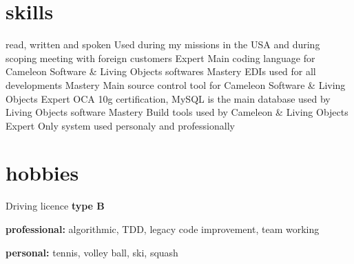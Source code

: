 \documentclass{friggeri-cv} 	%
\begin{document}
\section{skills}

\begin{capabilitize}
		{read, written and spoken}
		{Used during my missions in the USA and during scoping meeting with foreign customers}
		{Expert}
		{Main coding language for Cameleon Software \& Living Objects softwares}
		{Mastery}
		{EDIs used for all developments}
		{Mastery}
		{Main source control tool for Cameleon Software \& Living Objects}
		{Expert}
		{OCA 10g certification, MySQL is the main database used by Living Objects software}
		{Mastery}
		{Build tools used by Cameleon \& Living Objects}
		{Expert}
		{Only system used personaly and professionally}
\end{capabilitize}


\section{hobbies}

Driving licence \textbf{type B}

\textbf{professional:} algorithmic, TDD, legacy code improvement, team working

\textbf{personal:} tennis, volley ball, ski, squash
\end{document}
